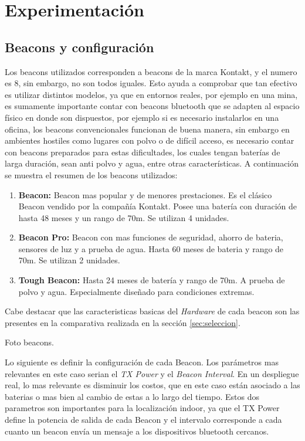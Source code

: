 \chapter{Experimentación}

\section{Beacons y configuración}

Los beacons utilizados corresponden a beacons de la marca Kontakt, y el numero es 8, sin embargo, no son todos iguales. Esto ayuda a comprobar que tan efectivo es utilizar distintos modelos, ya que en entornos reales, por ejemplo en una mina, es sumamente importante contar con beacons bluetooth que se adapten al espacio físico en donde son dispuestos, por ejemplo si es necesario instalarlos en una oficina, los beacons convencionales funcionan de buena manera, sin embargo en ambientes hostiles como lugares con polvo o de difícil acceso, es necesario contar con beacons preparados para estas dificultades, los cuales tengan baterías de larga duración, sean anti polvo y agua, entre otras características. A continuación se muestra el resumen de los beacons utilizados:

\begin{enumerate}
\item \textbf{Beacon: } Beacon mas popular y de menores prestaciones. Es el clásico Beacon vendido por la compañía Kontakt. Posee una batería con duración de hasta 48 meses y un rango de 70m. Se utilizan 4 unidades.

\item \textbf{Beacon Pro: } Beacon con mas funciones de seguridad, ahorro de bateria, sensores de luz y a prueba de agua. Hasta 60 meses de bateria y rango de 70m. Se utilizan 2 unidades.

\item \textbf{Tough Beacon: } Hasta 24 meses de batería y rango de 70m. A prueba de polvo y agua. Especialmente diseñado para condiciones extremas.


\end{enumerate}

Cabe destacar que las caracteristicas basicas del \textit{Hardware} de cada beacon son las presentes en la comparativa realizada en la sección \ref{sec:seleccion}.

Foto beacons.

Lo siguiente es definir la configuración de cada Beacon. Los parámetros mas relevantes en este caso serian el \textit{TX Power} y el \textit{Beacon Interval}. En un despliegue real, lo mas relevante es disminuir los costos, que en este caso están asociado a las baterias o mas bien al cambio de estas a lo largo del tiempo. Estos dos parametros son importantes para la localización indoor, ya que el TX Power define la potencia de salida de cada Beacon y el intervalo corresponde a cada cuanto un beacon envía un mensaje a los dispositivos bluetooth cercanos. 

